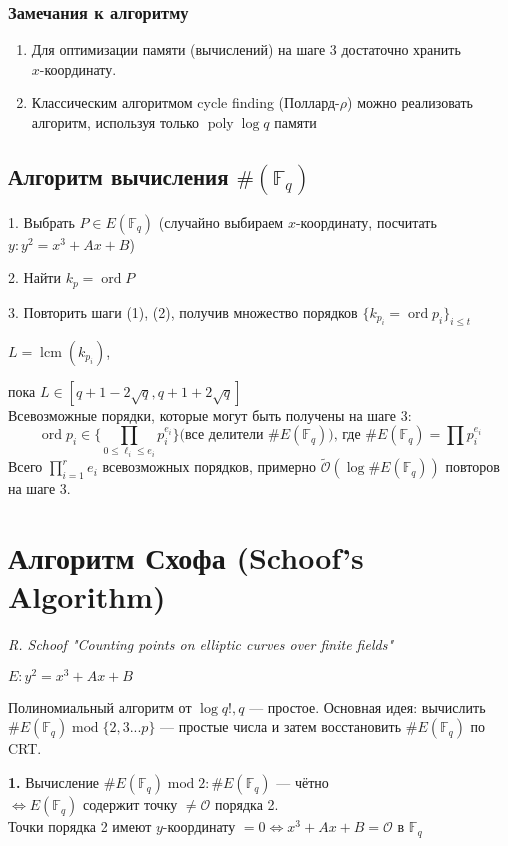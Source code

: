 \documentclass[12pt]{article}
\newcommand{\F}{{{\mathbb F}}}
\newcommand{\bigO}{\mathcal{O}}
\newcommand{\softO}{\widetilde{\bigO}}
\theoremstyle{definition}
\theoremstyle{definition}
\theoremstyle{definition}
\begin{document}
\subsubsection{Замечания к алгоритму}
\begin{enumerate}
    \item Для оптимизации памяти (вычислений) на шаге 3 достаточно хранить\\ $x$-координату.
    \item Классическим алгоритмом cycle finding (Поллард-$\rho$) можно реализовать алгоритм, используя только $\operatorname{poly} \log q$ памяти
\end{enumerate}

\subsection{Алгоритм вычисления $\#(\F_q)$}
1. Выбрать $P \in E(\F_q)$ (случайно выбираем $x$-координату, посчитать $y: y^2 = x^3 + Ax+B$)

2. Найти $k_p = \operatorname{ord}P$

3. Повторить шаги (1), (2), получив множество порядков $\{k_{p_i} = \operatorname{ord} p_i\}_{i\leq t}$

\quad $L = \operatorname{lcm}(k_{p_i})$,

пока $L \in \left[q+1-2\sqrt{q}, q+1+2\sqrt{q} \right]$\\

Всевозможные порядки, которые могут быть получены на шаге 3:
\[
    \operatorname{ord} p_i \in \{\prod_{0 \leq \ell_i \leq e_i} p_i^{e_i}\} \text{(все делители } \#E(\F_q)) \text{, где } \#E(\F_q) = \prod p_i^{e_i}
\]
Всего $\prod_{i=1}^r e_i$ всевозможных порядков, примерно $\softO(\log \#E(\F_q))$ повторов на шаге 3.

\section{Алгоритм Схофа (Schoof's Algorithm)}
\textit{R. Schoof "Counting points on elliptic curves over finite fields"}

$E: y^2 = x^3 + Ax + B$

Полиномиальный алгоритм от $\log q!, q$ — простое. 
Основная идея: вычислить $\#E(\F_q) \operatorname{mod} \{2, 3 ... p\}$ — простые числа и затем восстановить $\#E(\F_q)$ по CRT.

\textbf{1.} Вычисление $\#E(\F_q) \operatorname{mod} 2: \#E(\F_q)$ — чётно \\
$\Leftrightarrow E(\F_q)$ содержит точку $\neq \bigO$ порядка 2. \\
Точки порядка 2 имеют $y$-координату $= 0 \Leftrightarrow x^3 + Ax+B = \bigO$ в $\F_q$
\end{document}

